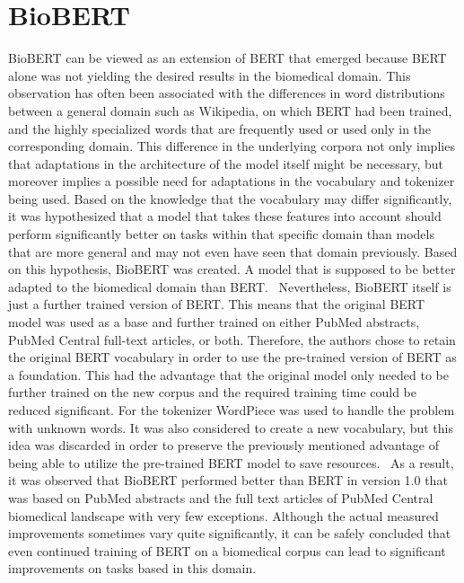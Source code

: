 \section{BioBERT}
BioBERT can be viewed as an extension of BERT that emerged because BERT alone was not yielding the desired results in the biomedical domain. This observation has often been associated with the differences in word distributions between a general domain such as Wikipedia, on which BERT had been trained, and the highly specialized words that are frequently used or used only in the corresponding domain.\cite{Devlin2018,Lee2019,Liu2021} This difference in the underlying corpora not only implies that adaptations in the architecture of the model itself might be necessary, but moreover implies a possible need for adaptations in the vocabulary and tokenizer being used. \cite{Lee2019} 
\newline
Based on the knowledge that the vocabulary may differ significantly, it was hypothesized that a model that takes these features into account should perform significantly better on tasks within that specific domain than models that are more general and may not even have seen that domain previously. Based on this hypothesis, BioBERT was created. A model that is supposed to be better adapted to the biomedical domain than BERT. \cite{Lee2019}
\newline
Nevertheless, BioBERT itself is just a further trained version of BERT. This means that the original BERT model was used as a base and further trained on either PubMed abstracts, PubMed Central full-text articles, or both. Therefore, the authors chose to retain the original BERT vocabulary in order to use the pre-trained version of BERT as a foundation. This had the advantage that the original model only needed to be further trained on the new corpus and the required training time could be reduced significant. %
For the tokenizer WordPiece was used to handle the problem with unknown words. It was also considered to create a new vocabulary, but this idea was discarded in order to preserve the previously mentioned advantage of being able to utilize the pre-trained BERT model to save resources. 
As a result, it was observed that BioBERT performed better than BERT in version 1.0 that was based on PubMed abstracts and the full text articles of PubMed Central biomedical landscape with very few exceptions. Although the actual measured improvements sometimes vary quite significantly, it can be safely concluded that even continued training of BERT on a biomedical corpus can lead to significant improvements on tasks based in this domain. \cite{Lee2019}

